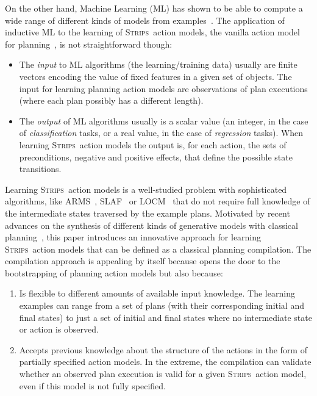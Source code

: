 \documentclass[letterpaper]{article} %
\newcommand{\strips}{\textsc{Strips}}     %
\begin{document}
On the other hand, Machine Learning (ML) has shown to be able to compute a wide range of different kinds of models from examples~\cite{michalski2013machine}. The application of inductive ML to the learning of \strips\ action models, the vanilla action model for planning~\cite{fikes1971strips}, is not straightforward though:
\begin{itemize}
\item The {\em input} to ML algorithms (the learning/training data) usually are finite vectors encoding the value of fixed features in a given set of objects. The input for learning planning action models are observations of plan executions (where each plan possibly has a different length).
\item The {\em output} of ML algorithms usually is a scalar value (an integer, in the case of {\em classification} tasks, or a real value, in the case of {\em regression} tasks). When learning \strips\ action models the output is, for each action, the sets of preconditions, negative and positive effects, that define the possible state transitions.
\end{itemize}

Learning \strips\ action models is a well-studied problem with sophisticated algorithms, like {\sc ARMS}~\cite{yang2007learning}, {\sc SLAF}~\cite{amir:alearning:JAIR08} or {\sc LOCM}~\cite{cresswell2013acquiring} that do not require full knowledge of the intermediate states traversed by the example plans. Motivated by recent advances on the synthesis of different kinds of generative models with classical planning~\cite{bonet2009automatic,segovia2016hierarchical,segovia2017generating}, this paper introduces an innovative approach for learning \strips\ action models that can be defined as a classical planning compilation. The compilation approach is appealing by itself because opens the door to the bootstrapping of planning action models but also because:
\begin{enumerate}
\item Is flexible to different amounts of available input knowledge. The learning examples can range from a set of plans (with their corresponding initial and final states) to just a set of initial and final states where no intermediate state  or action is observed.
\item Accepts previous knowledge about the structure of the actions in the form of partially specified action models. In the extreme, the compilation can validate whether an observed plan execution is valid for a given \strips\ action model, even if this model is not fully specified.
\end{enumerate}
\end{document}
